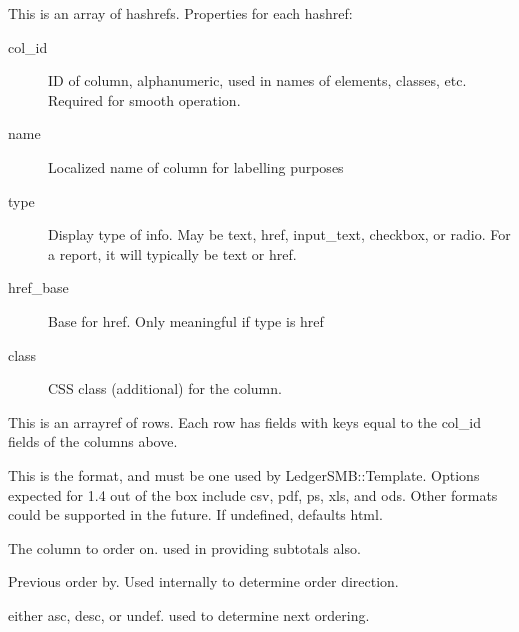 \begin{description}
\begin{description}
\begin{description}
\begin{description}
\begin{description}
\begin{description}
\begin{description}
\begin{description}
\begin{description}
\begin{description}
\begin{description}
This is an array of hashrefs.  Properties for each hashref:

\begin{description}

\item[{col\_id}] \mbox{}

ID of column, alphanumeric, used in names of elements, classes, etc.  Required
for smooth operation.


\item[{name}] \mbox{}

Localized name of column for labelling purposes


\item[{type}] \mbox{}

Display type of info.  May be text, href, input\_text, checkbox, or radio.  For a
report, it will typically be text or href.


\item[{href\_base}] \mbox{}

Base for href.  Only meaningful if type is href


\item[{class}] \mbox{}

CSS class (additional) for the column.

\end{description}

\item[{rows}] \mbox{}

This is an arrayref of rows.  Each row has fields with keys equal to the col\_id
fields of the columns above.


\item[{format}] \mbox{}

This is the format, and must be one used by LedgerSMB::Template.  Options
expected for 1.4 out of the box include csv, pdf, ps, xls, and ods.  Other
formats could be supported in the future.  If undefined, defaults html.


\item[{order\_by}] \mbox{}

The column to order on.  used in providing subtotals also.


\item[{old\_order\_by}] \mbox{}

Previous order by.  Used internally to determine order direction.


\item[{order\_dir}] \mbox{}

either asc, desc, or undef.  used to determine next ordering.



\end{description}
\end{description}
\end{description}
\end{description}
\end{description}
\end{description}
\end{description}
\end{description}
\end{description}
\end{description}
\end{description}
